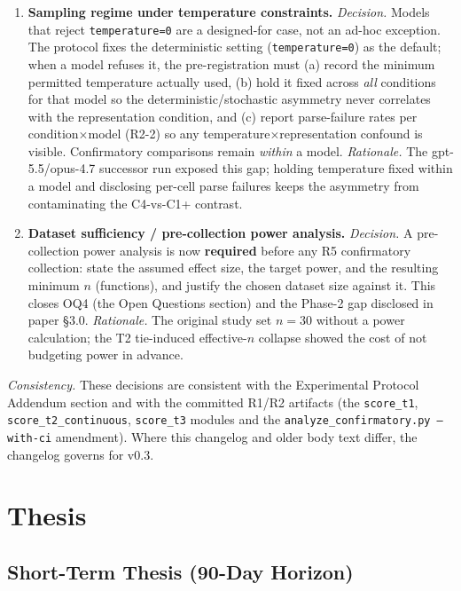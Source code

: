 \documentclass[11pt]{article}
\begin{document}
\begin{enumerate}
  \item \textbf{Sampling regime under temperature constraints.}
    \emph{Decision.} Models that reject \texttt{temperature=0} are a
    designed-for case, not an ad-hoc exception. The protocol fixes the
    deterministic setting (\texttt{temperature=0}) as the default; when a model
    refuses it, the pre-registration must (a) record the minimum permitted
    temperature actually used, (b) hold it fixed across \emph{all} conditions
    for that model so the deterministic/stochastic asymmetry never correlates
    with the representation condition, and (c) report parse-failure rates per
    condition$\times$model (R2-2) so any temperature$\times$representation
    confound is visible. Confirmatory comparisons remain \emph{within} a model.
    \emph{Rationale.} The gpt-5.5/opus-4.7 successor run exposed this gap;
    holding temperature fixed within a model and disclosing per-cell parse
    failures keeps the asymmetry from contaminating the C4-vs-C1+ contrast.

  \item \textbf{Dataset sufficiency / pre-collection power analysis.}
    \emph{Decision.} A pre-collection power analysis is now \textbf{required}
    before any R5 confirmatory collection: state the assumed effect size, the
    target power, and the resulting minimum $n$ (functions), and justify the
    chosen dataset size against it. This closes OQ4 (the Open Questions
    section) and the Phase-2 gap disclosed in paper \S3.0.
    \emph{Rationale.} The original study set $n=30$ without a power
    calculation; the T2 tie-induced effective-$n$ collapse showed the cost of
    not budgeting power in advance.
\end{enumerate}

\noindent\emph{Consistency.} These decisions are consistent with the
Experimental Protocol Addendum section and with the committed R1/R2
artifacts (the \texttt{score\_t1},
\texttt{score\_t2\_continuous}, \texttt{score\_t3} modules and the
\texttt{analyze\_confirmatory.py --with-ci} amendment). Where this changelog
and older body text differ, the changelog governs for v0.3.

\tableofcontents
\newpage

\section{Thesis}
\label{sec:thesis}

\subsection*{Short-Term Thesis (90-Day Horizon)}
\end{document}
